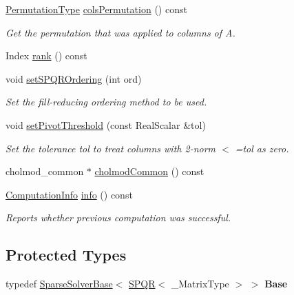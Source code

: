 \begin{DoxyCompactItemize}
\mbox{\label{class_eigen_1_1_s_p_q_r_ab1b7f54ba1cd8d77506ae676fea4fec0}} 
\mbox{\hyperlink{class_eigen_1_1_map}{Permutation\+Type}} \mbox{\hyperlink{class_eigen_1_1_s_p_q_r_ab1b7f54ba1cd8d77506ae676fea4fec0}{cols\+Permutation}} () const
\begin{DoxyCompactList}\small\item\em Get the permutation that was applied to columns of A. \end{DoxyCompactList}\item 
Index \mbox{\hyperlink{class_eigen_1_1_s_p_q_r_a539b394ddb4894089e6634c744ea2ddc}{rank}} () const
\item 
\mbox{\label{class_eigen_1_1_s_p_q_r_afa0db7888d808b453c23f62d62a4ad22}} 
void \mbox{\hyperlink{class_eigen_1_1_s_p_q_r_afa0db7888d808b453c23f62d62a4ad22}{set\+S\+P\+Q\+R\+Ordering}} (int ord)
\begin{DoxyCompactList}\small\item\em Set the fill-\/reducing ordering method to be used. \end{DoxyCompactList}\item 
\mbox{\label{class_eigen_1_1_s_p_q_r_ab7b42b75f621b0d4b5b0e090e23e2ce6}} 
void \mbox{\hyperlink{class_eigen_1_1_s_p_q_r_ab7b42b75f621b0d4b5b0e090e23e2ce6}{set\+Pivot\+Threshold}} (const Real\+Scalar \&tol)
\begin{DoxyCompactList}\small\item\em Set the tolerance tol to treat columns with 2-\/norm $<$ =tol as zero. \end{DoxyCompactList}\item 
cholmod\+\_\+common $\ast$ \mbox{\hyperlink{class_eigen_1_1_s_p_q_r_a8c7d48d51a1fb08a3e27b8499e5c7f49}{cholmod\+Common}} () const
\item 
\mbox{\hyperlink{group__enums_ga85fad7b87587764e5cf6b513a9e0ee5e}{Computation\+Info}} \mbox{\hyperlink{class_eigen_1_1_s_p_q_r_a3ab7bacba8d2be20adc10b4d5b6c071f}{info}} () const
\begin{DoxyCompactList}\small\item\em Reports whether previous computation was successful. \end{DoxyCompactList}\end{DoxyCompactItemize}
\subsection*{Protected Types}
\begin{DoxyCompactItemize}
\item 
\mbox{\label{class_eigen_1_1_s_p_q_r_a71bdab6a9a1a19479a93bc5d2ec732a1}} 
typedef \mbox{\hyperlink{class_eigen_1_1_sparse_solver_base}{Sparse\+Solver\+Base}}$<$ \mbox{\hyperlink{class_eigen_1_1_s_p_q_r}{S\+P\+QR}}$<$ \+\_\+\+Matrix\+Type $>$ $>$ {\bfseries Base}
\end{DoxyCompactItemize}
